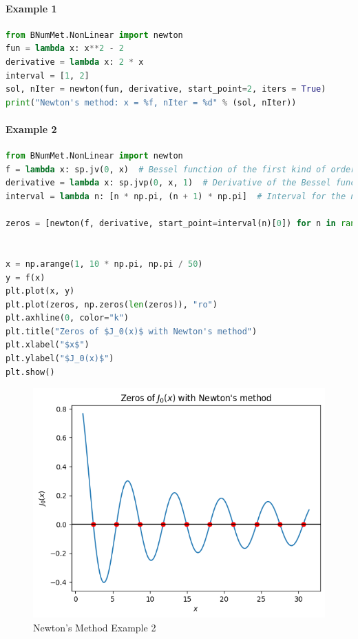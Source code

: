 \paragraph{Example 1}{
\begin{lstlisting}[language=Python]
from BNumMet.NonLinear import newton
fun = lambda x: x**2 - 2
derivative = lambda x: 2 * x
interval = [1, 2]
sol, nIter = newton(fun, derivative, start_point=2, iters = True)
print("Newton's method: x = %f, nIter = %d" % (sol, nIter))
\end{lstlisting}
}
\paragraph{Example 2}{
\begin{lstlisting}[language=Python]
from BNumMet.NonLinear import newton
f = lambda x: sp.jv(0, x)  # Bessel function of the first kind of order 0
derivative = lambda x: sp.jvp(0, x, 1)  # Derivative of the Bessel function
interval = lambda n: [n * np.pi, (n + 1) * np.pi]  # Interval for the n-th zero

zeros = [newton(f, derivative, start_point=interval(n)[0]) for n in range(1, 11)]


x = np.arange(1, 10 * np.pi, np.pi / 50)
y = f(x)
plt.plot(x, y)
plt.plot(zeros, np.zeros(len(zeros)), "ro")
plt.axhline(0, color="k")
plt.title("Zeros of $J_0(x)$ with Newton's method")
plt.xlabel("$x$")
plt.ylabel("$J_0(x)$")
plt.show()
\end{lstlisting}
}
\begin{figure}[H]
    \centering
    \includegraphics{Include/Images/Thesis/Documentation/NonLinear/Newtons Example 2.png}
    \caption{Newton's Method Example 2}
    \label{fig:Newton's Method Example 2}
\end{figure}